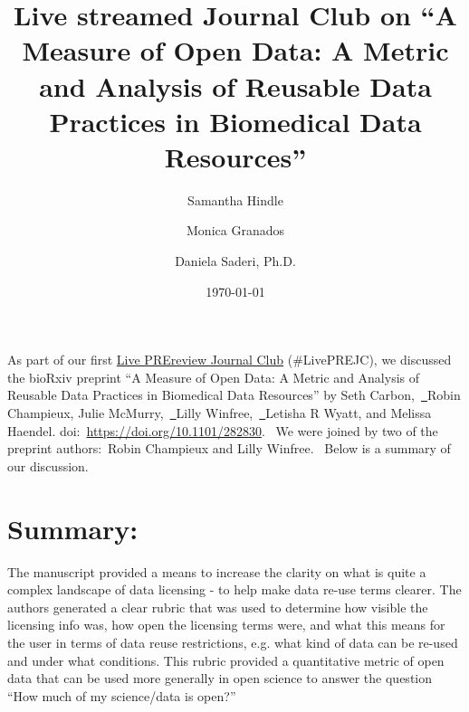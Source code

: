 \documentclass[10pt]{article}
\renewenvironment{abstract}
  {{\bfseries\noindent{\abstractname}\par\nobreak}\footnotesize}
  {\bigskip}
\begin{document}
\title{Live streamed Journal Club on ``A Measure of Open Data: A Metric and
Analysis of Reusable Data Practices in Biomedical Data Resources''}



\author[1]{Samantha Hindle}%
\author[1]{Monica Granados}%
\author[1]{Daniela Saderi, Ph.D.}%
%


\vspace{-1em}



  \date{\today}


\begingroup
\let\center\flushleft
\let\endcenter\endflushleft
\maketitle
\endgroup





\begin{abstract}
As part of our first
\href{https://www.prereview.org/users/164141/articles/301936-live-prereview-journal-clubs-liveprejc}{Live
PREreview Journal Club} (\#LivePREJC), we discussed the bioRxiv preprint
``A Measure of Open Data: A Metric and Analysis of Reusable Data
Practices in Biomedical Data Resources'' by Seth
Carbon,~\href{http://orcid.org/0000-0001-7023-9832}{~}Robin Champieux,
Julie McMurry,~\href{http://orcid.org/0000-0001-7120-8536}{~}Lilly
Winfree,~\href{http://orcid.org/0000-0003-1026-5232}{~}Letisha R Wyatt,
and Melissa Haendel. doi:~\url{https://doi.org/10.1101/282830}.~ We were
joined by two of the preprint authors:~Robin Champieux and Lilly
Winfree.~ Below is a summary of our discussion.~%
\end{abstract}%




\section*{}

\section*{Summary:}

{\label{547062}}

The manuscript provided a means to increase the clarity on what is quite
a complex landscape of data licensing - to help make data re-use terms
clearer. The authors generated a clear rubric that was used to determine
how visible the licensing info was, how open the licensing terms were,
and what this means for the user in terms of data reuse restrictions,
e.g. what kind of data can be re-used and under what conditions. This
rubric provided a quantitative metric of open data that can be used more
generally in open science to answer the question ``How much of my
science/data is open?''
\end{document}
